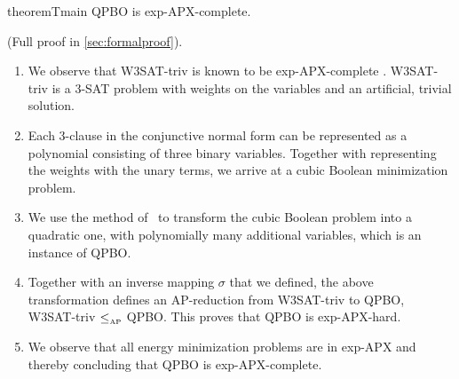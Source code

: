 \begin{restatable}{theorem}{Tmain}\label{th:main}
QPBO is exp-APX-complete.
\end{restatable}
\begin{proofsketch} (Full proof in \cref{sec:formalproof}).
\begin{enumerate}
\item We observe that W3SAT-triv is known to be exp-APX-complete \cite{ausiello1999complexity}. W3SAT-triv is a 3-SAT problem with weights on the variables and an artificial, trivial solution.
\item Each 3-clause in the conjunctive normal form can be represented as a polynomial consisting of three binary variables. Together with representing the weights with the unary terms, we arrive at a cubic Boolean minimization problem.
\item We use the method of~\cite{ishikawa2011transformation} to transform the cubic Boolean problem into a quadratic one, with polynomially many additional variables, which is an instance of QPBO.
\item Together with an inverse mapping $\sigma$ that we defined, the above transformation defines an AP-reduction from W3SAT-triv to QPBO, \ie W3SAT-triv $\mathbin{{\leq}_{\text{\tiny AP}}}$ QPBO. This proves that QPBO is exp-APX-hard.
\item We observe that all energy minimization problems are in exp-APX and thereby concluding that QPBO is exp-APX-complete.
\end{enumerate}
\end{proofsketch}

